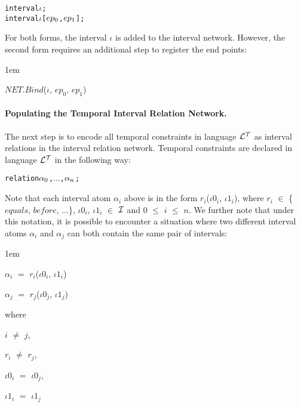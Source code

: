 \documentclass[11pt]{report}
\newenvironment{vverbatim}
{
  \begin{alltt}
}
{
    \vspace{-\baselineskip}
  \end{alltt}
}
\newenvironment{vquote}
{
  \begin{list}{}{\leftmargin 1em}\item[]
}
{
  \end{list}
}
\begin{document}
            \begin{vverbatim}
  interval \(\iota\);
  interval \(\iota\) [\(ep\sb{0}\), \(ep\sb{1}\)];
            \end{vverbatim}

            \noindent
            For both forms, the interval $\iota$ is added to the interval
            network. However, the second form requires an additional step
            to register the end points:

            \begin{vquote}
              $NET.Bind$($\iota$, $ep_0$, $ep_1$)
            \end{vquote}

          \paragraph
            {\bf Populating the Temporal Interval Relation Network.}

            The next step is to encode all temporal constraints in
            language ${\cal L^T}$ as interval relations in the interval
            relation network. Temporal constraints are declared in language
            ${\cal L^T}$ in the following way:

            \begin{vverbatim}
  relation \(\alpha\sb{0}\), \(\ldots\), \(\alpha\sb{n}\);
            \end{vverbatim}

            Note that each interval atom ${\alpha}_i$ above is in the form
            $r_i$(${\iota}0_i$, ${\iota}1_i$), where $r_i$ $\in$ \{$equals$,
            $before$, $\ldots$\}, ${\iota}0_i$, ${\iota}1_i$ $\in$
            ${\cal I}$ and $0$ $\leq$ $i$ $\leq$ $n$. We further note that
            under this notation, it is possible to encounter a situation
            where two different interval atoms ${\alpha}_i$ and ${\alpha}_j$
            can both contain the same pair of intervals:

            \begin{vquote}
              ${\alpha}_i$ $=$ $r_i$(${\iota}0_i$, ${\iota}1_i$)

              ${\alpha}_j$ $=$ $r_j$(${\iota}0_j$, ${\iota}1_j$)

              where

              \hspace{1em}
              $i$ $\neq$ $j$,

              \hspace{1em}
              $r_i$ $\neq$ $r_j$,

              \hspace{1em}
              ${\iota}0_i$ $=$ ${\iota}0_j$,

              \hspace{1em}
              ${\iota}1_i$ $=$ ${\iota}1_j$
            \end{vquote}
\end{document}
